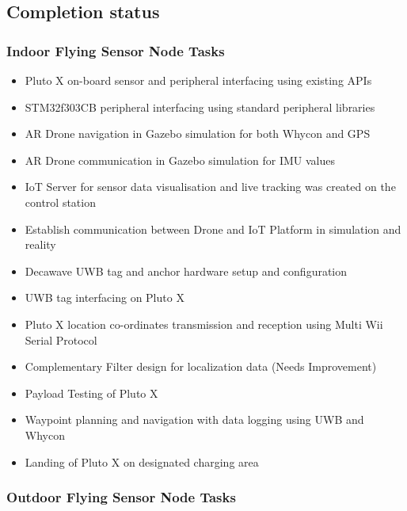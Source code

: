 \documentclass[a4paper,12pt,oneside]{book}
\begin{document}
\subsection*{Completion status}
\subsubsection{Indoor Flying Sensor Node Tasks} 

\begin{itemize}
\item Pluto X on-board sensor and peripheral interfacing using existing APIs
\item STM32f303CB peripheral interfacing using standard peripheral libraries
\item AR Drone navigation in Gazebo simulation for both Whycon and GPS
\item AR Drone communication in Gazebo simulation for IMU values
\item IoT Server for sensor data visualisation and live tracking was created on the control station
\item Establish communication between Drone and IoT Platform in simulation and reality
\item Decawave UWB tag and anchor hardware setup and configuration
\item UWB tag interfacing on Pluto X
\item Pluto X location co-ordinates transmission and reception using Multi Wii Serial Protocol
\item Complementary Filter design for localization data (Needs Improvement)
\item Payload Testing of Pluto X
\item Waypoint planning and navigation with data logging using UWB and Whycon
\item Landing of Pluto X on designated charging area 
\end{itemize}

\subsubsection{Outdoor Flying Sensor Node Tasks} 
\end{document}
